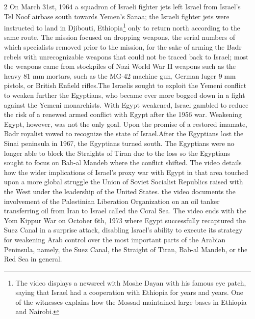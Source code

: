 \documentclass[10pt,a4paper,twoside]{article} %
\begin{document}
\begin{multicols}{2}
{\newline \indent On March 31st, 1964 a squadron of Israeli fighter jets left Israel from Israel's Tel Noof airbase south towards Yemen's Sanaa; the Israeli fighter jets were instructed to land in Djibouti, Ethiopia\footnote{The video displays a newsreel with Moshe Dayan with his famous eye patch, saying that Israel had a cooperation with Ethiopia for years and years. One of the witnesses explains how the Mossad maintained large bases in Ethiopia and Nairobi. } only to return north according to the same route. The mission focused on dropping weapons, the serial numbers of which specialists removed prior to the mission, for the sake of arming the Badr rebels with unrecognizable weapons that could not be traced back to Israel; most the weapons came from stockpiles of Nazi World War II weapons such as the heavy 81 mm mortars, such as the MG-42 machine gun, German luger 9 mm pistols, or British Enfield rifles.\newline \indent The Israelis sought to exploit the Yemeni conflict to weaken further the Egyptians, who became ever more bogged down in a fight against the Yemeni monarchists. With Egypt weakened, Israel gambled to reduce the risk of a renewed armed conflict with Egypt after the 1956 war. Weakening Egypt, however, was not the only goal. Upon the promise of a restored imamate, Badr royalist vowed to recognize the state of Israel.\newline \indent After the Egyptians lost the Sinai peninsula in 1967, the Egyptians turned south. The Egyptians were no longer able to block the Straights of Tiran due to the loss so the Egyptians sought to focus on Bab-al Mandeb where the conflict shifted. The video details how the wider implications of Israel's proxy war with Egypt in that area touched upon a more global struggle the Union of Soviet Socialist Republics raised with the West under the leadership of the United States. \newline \indent the video documents the involvement of the Palestinian Liberation Organization on an oil tanker transferring oil from Iran to Israel called the Coral Sea. \newline \indent The video ends with the Yom Kippur War on October 6th, 1973 where Egypt successfully recaptured the Suez Canal in a surprise attack, disabling Israel's ability to execute its strategy for weakening Arab control over the most important parts of the Arabian Peninsula, namely, the Suez Canal, the Straight of Tiran, Bab-al Mandeb, or the Red Sea in general.  
} 


\end{multicols}
\end{document}
